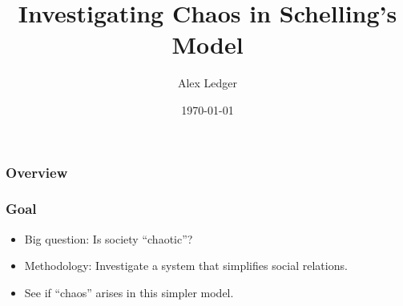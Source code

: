 \documentclass[11pt, handout]{beamer}
\title[Short title]{Investigating Chaos in Schelling's Model} %
\author{Alex Ledger} %
\institute[Reed College] %
{
Reed College \\ %
\medskip
\textit{aledger@reed.edu}%
}
\date{\today} %
\begin{document}
\begin{frame}
\titlepage 
\end{frame}

\begin{frame}
\frametitle{Overview} 
\tableofcontents 
\end{frame}

\begin{frame}
    \frametitle{Goal}
    \begin{itemize}
        \item Big question: Is society ``chaotic''?
        \item Methodology: Investigate a system that simplifies social relations. 
        \item See if ``chaos'' arises in this simpler model.
    \end{itemize}
\end{frame}
\end{document}
